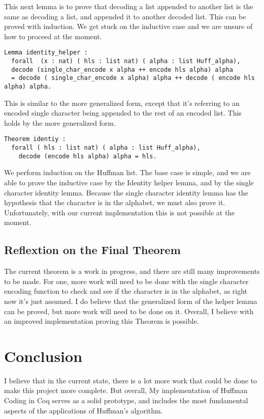 \documentclass{llncs}
\begin{document}
This next lemma is to prove that decoding a list appended to another list is the same as decoding a list, and appended it to another decoded list. This can be proved with induction.  We get stuck on the inductive case and we are unsure of how to proceed at the moment.

\begin{lstlisting}
Lemma identity_helper :
  forall  (x : nat) ( hls : list nat) ( alpha : list Huff_alpha),
  decode (single_char_encode x alpha ++ encode hls alpha) alpha
  = decode ( single_char_encode x alpha) alpha ++ decode ( encode hls alpha) alpha.
\end{lstlisting}

This is similar to the more generalized form, except that it’s referring to an encoded single character being appended to the rest of an encoded list. This holds by the more generalized form.

\begin{lstlisting}
Theorem identiy :
  forall ( hls : list nat) ( alpha : list Huff_alpha),
    decode (encode hls alpha) alpha = hls.
\end{lstlisting}

We perform induction on the Huffman list.  The base case is simple, and we are able to prove the inductive case by the Identity helper lemma, and by the single character identity lemma. Because the single character identity lemma has the hypothesis that the character is in the alphabet, we must also prove it.  Unfortunately, with our current implementation this is not possible at the moment. 

\subsection{Reflextion on the Final Theorem}

The current theorem is a work in progress, and there are still many improvements to be made. For one, more work will need to be done with the single character encoding function to check and see if the character is in the alphabet, as right now it’s just assumed. I do believe that the generalized form of the helper lemma can be proved, but more work will need to be done on it. Overall, I believe with an improved implementation proving this Theorem is possible.

\section{Conclusion}
 I believe that in the current state, there is a lot more work that could be done to make this project more complete. But overall, My implementation of Huffman Coding in Coq serves as a solid prototype, and includes the most fundamental aspects of the applications of Huffman’s algorithm. 
\end{document}
